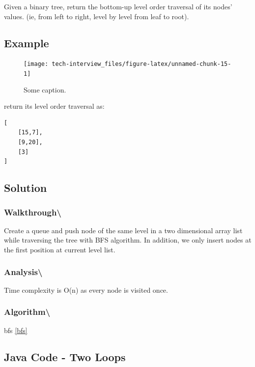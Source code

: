 \documentclass[]{book}
\begin{document}
Given a binary tree, return the bottom-up level order traversal of its nodes' values. (ie, from left to right, level by level from leaf
to root).

\hypertarget{example-53}{%
\subsection{Example}\label{example-53}}

\begin{figure}
\texttt{[image: tech-interview\_files/figure-latex/unnamed-chunk-15-1]} \caption{Some caption.}\label{fig:unnamed-chunk-15}
\end{figure}

return its level order traversal as:

\begin{verbatim}
[
    [15,7],
    [9,20],
    [3]
]
\end{verbatim}

\hypertarget{solution-37}{%
\subsection{Solution}\label{solution-37}}

\hypertarget{walkthrough-57}{%
\subsubsection{Walkthrough\textbackslash{}}\label{walkthrough-57}}

Create a queue and push node of the same level in a two dimensional array list while traversing the tree with
BFS algorithm. In addition, we only insert nodes at the first position at current level list.

\hypertarget{analysis-64}{%
\subsubsection{Analysis\textbackslash{}}\label{analysis-64}}

Time complexity is O(n) as every node is visited once.

\hypertarget{algorithm-66}{%
\subsubsection{Algorithm\textbackslash{}}\label{algorithm-66}}

bfs \ref{bfs}

\hypertarget{java-code---two-loops}{%
\subsection{Java Code - Two Loops}\label{java-code---two-loops}}
\end{document}
